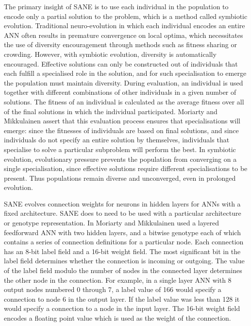\documentclass[12pt]{article} %
\begin{document}
The primary insight of SANE \cite{Moriarty1996} is to use each individual in the population to encode only a partial solution to the problem, which is a method called symbiotic evolution. Traditional neuro-evolution in which each individual encodes an entire ANN often results in premature convergence on local optima, which necessitates the use of diversity encouragement through methods such as fitness sharing or crowding. However, with symbiotic evolution, diversity is automatically encouraged. Effective solutions can only be constructed out of individuals that each fulfill a specialised role in the solution, and for such specialisation to emerge the population must maintain diversity. During evaluation, an individual is used together with different combinations of other individuals in a given number of solutions. The fitness of an individual is calculated as the average fitness over all of the final solutions in which the individual participated. Moriarty and Mikkulainen assert that this evaluation process ensures that specialisations will emerge: since the fitnesses of individuals are based on final solutions, and since individuals do not specify an entire solution by themselves, individuals that specialise to solve a particular subproblem will perform the best. In symbiotic evolution, evolutionary pressure prevents the population from converging on a single specialisation, since effective solutions require different specialisations to be present. Thus populations remain diverse and unconverged, even in prolonged evolution.

SANE evolves connection weights for neurons in hidden layers for ANNs with a fixed architecture. SANE does to need to be used with a particular architecture or genotype representation. In \cite{Moriarty1996} Moriarty and Mikkulainen used a layered feedforward ANN with two hidden layers, and a bitwise genotype each of which contains a series of connection definitions for a particular node. Each connection has an 8-bit label field and a 16-bit weight field. The most significant bit in the label field determines whether the connection is incoming or outgoing. The value of the label field modulo the number of nodes in the connected layer determines the other node in the connection. For example, in a single layer ANN with 8 output nodes numbered 0 through 7, a label value of 166 would specify a connection to node 6 in the output layer. If the label value was less than 128 it would specify a connection to a node in the input layer. The 16-bit weight field encodes a floating point value which is used as the weight of the connection.
\end{document}

